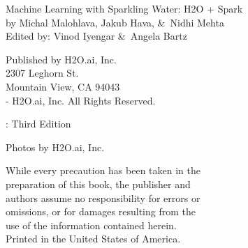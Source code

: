     {\raggedright\vfill

    Machine Learning with Sparkling Water: H2O + Spark\\
    by Michal Malohlava, Jakub Hava, \&\ Nidhi Mehta\\
    Edited by: Vinod Iyengar \&\ Angela Bartz

    \bigskip
    Published by H2O.ai, Inc. \\
    2307 Leghorn St. \\
    Mountain View, CA 94043\\
    \bigskip
    -\the\year \hspace{1pt} H2O.ai, Inc. All Rights Reserved.
    \bigskip

    \monthname \hspace{1pt}  \the\year: Third Edition
    \bigskip

    Photos by \textcopyright H2O.ai, Inc.
    \bigskip

    While every precaution has been taken in the\\
    preparation of this book, the publisher and\\
    authors assume no responsibility for errors or\\
    omissions, or for damages resulting from the\\
    use of the information contained herein.\\
    \bigskip
    Printed in the United States of America.


    }\par

    \newpage
    \tableofcontents

    \newpage
    

    \newpage
    

    \newpage
    

    \newpage
    

    \newpage
    

    \newpage
    

    \newpage
    

    \newpage
    

    \newpage
    

    \newpage
    

    \newpage
    

